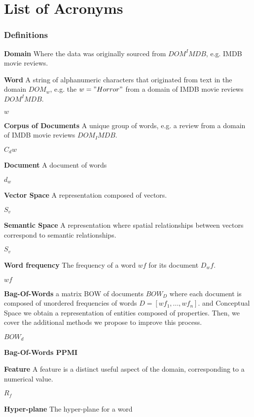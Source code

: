 \chapter*{List of Acronyms} 
\begin{acronym}


\subsection{Definitions}

\textbf{Domain} Where the data was originally sourced from $DOM^IMDB$, e.g. IMDB movie reviews. 

\textbf{Word} A string of alphanumeric characters that originated from text in the domain $DOM_w$, e.g. the $w = "Horror"$ from a domain of IMDB movie reviews $DOM^IMDB$.

$w$

\textbf{Corpus of Documents} A unique group of words, e.g. a review from a domain of IMDB movie reviews $DOM_IMDB$.

$C_dw$

\textbf{Document} A document of words

$d_w$

\textbf{Vector Space} A representation composed of vectors.

$S_v$

\textbf{Semantic Space} A representation where spatial relationships between vectors correspond to semantic relationships.

$S_v$

\textbf{Word frequency} The frequency of a word $wf$ for its document $D_wf$.

$wf$


\textbf{Bag-Of-Words} a matrix BOW of documents $BOW_D$ where each document is composed of unordered frequencies of words $D = [wf_1, ..., wf_n]$. and Conceptual Space we obtain a representation of entities composed of properties. Then, we cover the additional methods we propose to improve this process.

$BOW_d$ 

\textbf{Bag-Of-Words PPMI}



\textbf{Feature} A feature is a distinct useful aspect of the domain, corresponding to a numerical value. 

$R_f$

\textbf{Hyper-plane} The hyper-plane for a word


\end{acronym}
